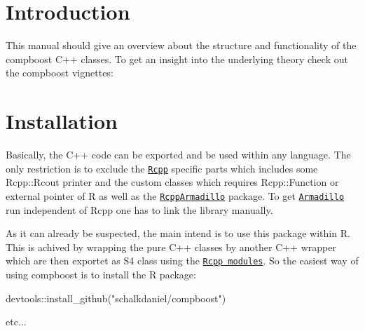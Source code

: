 \hypertarget{index_intro_sec}{}\section{Introduction}\label{index_intro_sec}
This manual should give an overview about the structure and functionality of the {\ttfamily compboost} {\ttfamily C++} classes. To get an insight into the underlying theory check out the {\ttfamily compboost} vignettes\+:\hypertarget{index_install_sec}{}\section{Installation}\label{index_install_sec}
Basically, the {\ttfamily C++} code can be exported and be used within any language. The only restriction is to exclude the \href{https://cran.r-project.org/web/packages/Rcpp/vignettes/Rcpp-introduction.pdf}{\tt {\ttfamily Rcpp}} specific parts which includes some {\ttfamily Rcpp\+::\+Rcout} printer and the custom classes which requires {\ttfamily Rcpp\+::\+Function} or external pointer of {\ttfamily R} as well as the \href{https://cran.r-project.org/web/packages/RcppArmadillo/vignettes/RcppArmadillo-intro.pdf}{\tt {\ttfamily Rcpp\+Armadillo}} package. To get \href{http://arma.sourceforge.net}{\tt {\ttfamily Armadillo}} run independent of {\ttfamily Rcpp} one has to link the library manually.

As it can already be suspected, the main intend is to use this package within {\ttfamily R}. This is achived by wrapping the pure {\ttfamily C++} classes by another {\ttfamily C++} wrapper which are then exportet as {\ttfamily S4} class using the \href{https://cran.r-project.org/web/packages/Rcpp/vignettes/Rcpp-modules.pdf}{\tt Rcpp modules}. So the easiest way of using {\ttfamily compboost} is to install the {\ttfamily R} package\+:


\begin{DoxyCode}
devtools::install\_github(\textcolor{stringliteral}{"schalkdaniel/compboost"})
\end{DoxyCode}


etc... 